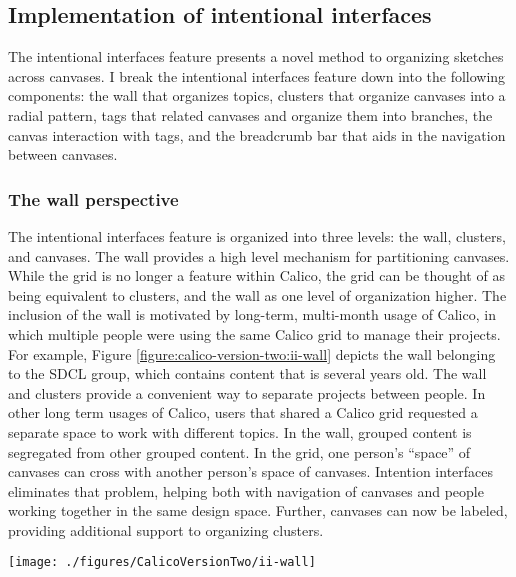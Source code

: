 \documentclass[12pt,fleqn]{ucithesis}
\begin{document}
\subsection{Implementation of intentional interfaces}

The intentional interfaces feature presents a novel method to organizing sketches across canvases. I break the intentional interfaces feature down into the following components: the wall that organizes topics, clusters that organize canvases into a radial pattern, tags that related canvases and organize them into branches, the canvas interaction with tags, and the breadcrumb bar that aids in the navigation between canvases.

\subsubsection{The wall perspective} 

The intentional interfaces feature is organized into three levels: the wall, clusters, and canvases. The wall provides a high level mechanism for partitioning canvases.  While the grid is no longer a feature within Calico, the grid can be thought of as being equivalent to clusters, and the wall as one level of organization higher. The inclusion of the wall is motivated by long-term, multi-month usage of Calico, in which multiple people were using the same Calico grid to manage their projects. For example, Figure \ref{figure:calico-version-two:ii-wall} depicts the wall belonging to the SDCL group, which contains content that is several years old. The wall and clusters provide a convenient way to separate projects between people. In other long term usages of Calico, users that shared a Calico grid requested a separate space to work with different topics. In the wall, grouped content is segregated from other grouped content. In the grid, one person's ``space'' of canvases can cross with another person’s space of canvases. Intention interfaces eliminates that problem, helping both with navigation of canvases and people working together in the same design space. Further, canvases can now be labeled, providing additional support to organizing clusters. 

\begin{figure*}[tbh]
  \centering
  \texttt{[image: ./figures/CalicoVersionTwo/ii-wall]}
  \caption{The Calico wall belonging to the SDCL group, which contains sketches that are several years old and are used by several group members regularly.}
  \label{figure:calico-version-two:ii-wall}
\end{figure*}
\end{document}
